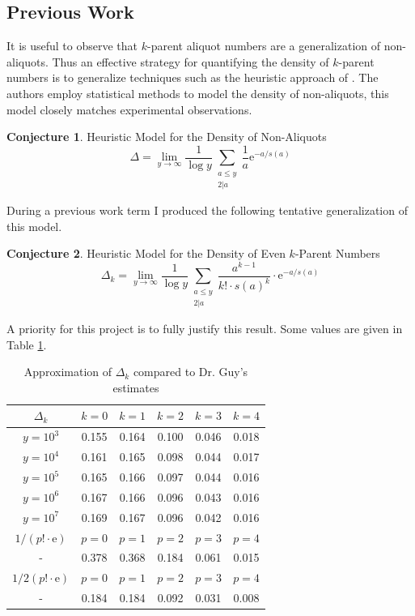\documentclass{article}
\theoremstyle{definition}
\newtheorem{conjecture}{Conjecture}[section]
\begin{document}
\subsection{Previous Work}
It is useful to observe that $k$-parent aliquot numbers are a generalization of non-aliquots. Thus an effective strategy for quantifying the density of $k$-parent numbers is to generalize techniques such as the heuristic approach of \cite{pollPom}. The authors employ statistical methods to model the density of non-aliquots, this model closely matches experimental observations.
% 
\begin{conjecture}{Heuristic Model for the Density of Non-Aliquots}
$$\Delta = \lim_{y \to \infty}\frac{1}{\log y} \sum_{\substack{a\leq y \\ 2 | a}} \frac{1}{a}\text{e}^{-a/s(a)}$$
\end{conjecture}
%
During a previous work term I produced the following tentative generalization of this model.
%
\begin{conjecture}{Heuristic Model for the Density of Even $k$-Parent Numbers}
$$\Delta_k = \lim_{y \to \infty} \frac{1}{\log y}\sum_{\substack{a \leq y \\ 2 | a}} \frac{a^{k-1}}{k! \cdot s(a)^k} \cdot \text{e}^{-a/s(a)}$$
\end{conjecture}
%
A priority for this project is to fully justify this result. Some values are given in Table \ref{tab:hueristic-dr.guy}.
%
\begin{table}[H]
 	\centering
    \begin{tabular}{| c | c | c | c | c | c |}
      \hline
      $\Delta_k$     &   $k = 0$  &   $k = 1$  &   $k = 2$  &   $k = 3$  &   $k = 4$  \\ 
        \hline
        $y = 10^3$  &   0.155   &   0.164   &   0.100   &   0.046   &   0.018   \\
        $y = 10^4$  &   0.161   &   0.165   &   0.098   &   0.044   &   0.017   \\
        $y = 10^5$  &   0.165   &   0.166   &   0.097   &   0.044   &   0.016   \\
        $y = 10^6$  &   0.167   &   0.166   &   0.096   &   0.043   &   0.016   \\
        $y = 10^7$  &   0.169   &   0.167   &   0.096   &   0.042   &   0.016   \\
      \hline
      \hline
      \hline
      $1/(p! \cdot \text{e})$   &   $p = 0$ &   $p = 1$ &   $p = 2$ &   $p = 3$    &   $p = 4$ \\
      \hline
      - &   0.378   &   0.368   &   0.184   &   0.061   &   0.015   \\
      \hline
      \hline
      $1/2(p! \cdot \text{e})$  &   $p = 0$ &   $p = 1$ &   $p = 2$ &   $p = 3$    &   $p = 4$ \\
      \hline
      -     &   0.184   &   0.184   &   0.092   &   0.031   &   0.008   \\
      \hline
	\end{tabular}
    \caption{Approximation of $\Delta_k$ compared to Dr. Guy's estimates}
    \label{tab:hueristic-dr.guy}
\end{table}
\end{document}
